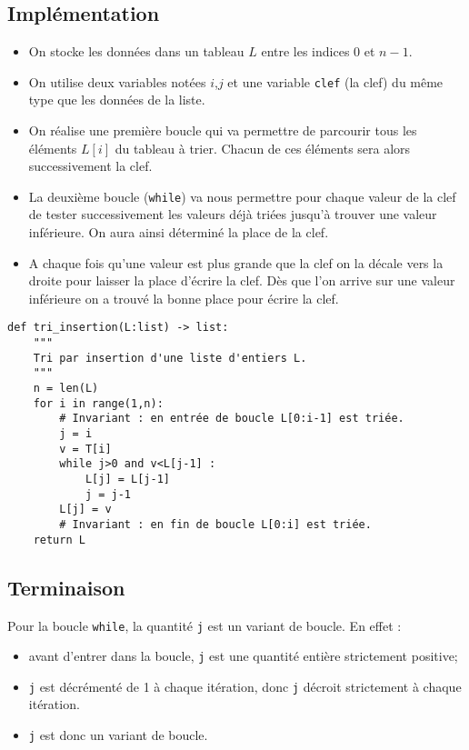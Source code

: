\subsection{Implémentation}


\begin{itemize}
\item On stocke les données dans un tableau $L$ entre les indices $0$ et $n-1$.
\item On utilise deux variables notées $i$,$j$ et une variable \texttt{clef} (la clef) du même type que les données de la liste.
\item On réalise une première boucle qui va permettre de parcourir tous les éléments $L[i]$ du tableau à trier.
Chacun de ces éléments sera alors successivement la clef.
\item La deuxième boucle (\texttt{while}) va nous permettre pour chaque valeur de la clef de tester successivement les valeurs déjà triées jusqu'à trouver une valeur inférieure. On aura ainsi déterminé la place de la clef.
\item A chaque fois qu'une valeur est plus grande que la clef on la décale vers la droite pour laisser la place d'écrire la clef.
Dès que l'on arrive sur une valeur inférieure on a trouvé la bonne place pour écrire la clef.
\end{itemize}


\begin{lstlisting}
def tri_insertion(L:list) -> list:
    """
    Tri par insertion d'une liste d'entiers L.
    """
    n = len(L)
    for i in range(1,n):
        # Invariant : en entrée de boucle L[0:i-1] est triée.
        j = i
        v = T[i]
        while j>0 and v<L[j-1] :
            L[j] = L[j-1]
            j = j-1
        L[j] = v
        # Invariant : en fin de boucle L[0:i] est triée.
    return L
\end{lstlisting}    


\subsection{Terminaison}

Pour la boucle \texttt{while}, la quantité \texttt{j} est un variant de boucle. En effet :
\begin{itemize}
\item avant d'entrer dans la boucle, \texttt{j} est une quantité entière strictement positive;
\item \texttt{j} est décrémenté de 1 à chaque itération, donc \texttt{j} décroit strictement à chaque itération. 
\item \texttt{j} est donc un variant de boucle.
\end{itemize}


